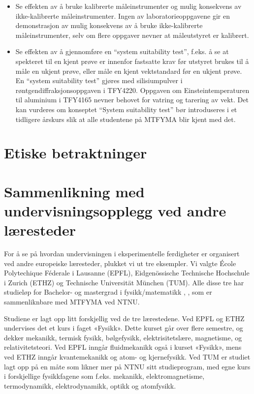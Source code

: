 \documentclass{article}
\begin{document}
\begin{itemize}
  \item Se effekten av å bruke kalibrerte måleinstrumenter og mulig konsekvens av ikke-kalibrerte måleinstrumenter. Ingen av laboratorieoppgavene gir en demonstrasjon av mulig konsekvens av å bruke ikke-kalibrerte måleinstrumenter, selv om flere oppgaver nevner at måleutstyret er kalibrert.

  \item Se effekten av å gjennomføre en ``system suitability test'', f.eks. å se at spekteret til en kjent prøve er innenfor fastsatte krav før utstyret brukes til å måle en ukjent prøve, eller måle en kjent vektstandard før en ukjent prøve.  En ``system suitability test'' gjøres med silisiumpulver i røntgendiffraksjonsoppgaven i TFY4220. Oppgaven om Einsteintemperaturen til aluminium i TFY4165 nevner behovet for vatring og tarering av vekt. Det kan vurderes om konseptet ``System suitability test'' bør introduseres i et tidligere årskurs slik at alle studentene på MTFYMA blir kjent med det.
\end{itemize}


\section{Etiske betraktninger}


\section{Sammenlikning med undervisningsopplegg ved andre læresteder}

For å se på hvordan undervisningen i eksperimentelle ferdigheter er organisert ved andre europeiske læresteder, plukket vi ut tre eksempler. Vi valgte École Polytechique Féderale i Lausanne (EPFL), Eidgenössische Technische Hochschule i Zurich (ETHZ) og Technische Universität München (TUM). Alle disse tre har studieløp for Bachelor- og mastergrad i fysikk/matematikk \cite{ETHZprog}, \cite{EPFLprog}, \cite{TUMprog} som er sammenliknbare med MTFYMA ved NTNU. 

Studiene er lagt opp litt forskjellig ved de tre lærestedene. Ved EPFL og ETHZ undervises det et kurs i faget «Fysikk». Dette kurset går over flere semestre, og dekker mekanikk, termisk fysikk, bølgefysikk, elektrisitetslære, magnetisme, og relativitetsteori. Ved EPFL inngår fluidmekanikk også i kurset «Fysikk», mens ved ETHZ inngår kvantemekanikk og atom- og kjernefysikk. Ved TUM er studiet lagt opp på en måte som likner mer på NTNU sitt studieprogram, med egne kurs i forskjellige fysikkfagene som f.eks. mekanikk, elektromagnetisme, termodynamikk, elektrodynamikk, optikk og atomfysikk. 
\end{document}
